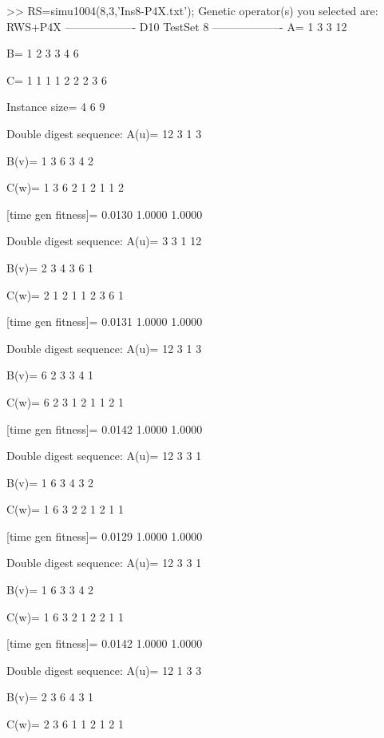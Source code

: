 >> RS=simu1004(8,3,'Ins8-P4X.txt');
Genetic operator(s) you selected are:
RWS+P4X
------------------- D10 TestSet 8 -------------------
A=
     1     3     3    12

B=
     1     2     3     3     4     6

C=
     1     1     1     1     2     2     2     3     6

Instance size=
     4     6     9

Double digest sequence:
A(u)=
    12     3     1     3

B(v)=
     1     3     6     3     4     2

C(w)=
     1     3     6     2     1     2     1     1     2

[time gen fitness]=
    0.0130    1.0000    1.0000

Double digest sequence:
A(u)=
     3     3     1    12

B(v)=
     2     3     4     3     6     1

C(w)=
     2     1     2     1     1     2     3     6     1

[time gen fitness]=
    0.0131    1.0000    1.0000

Double digest sequence:
A(u)=
    12     3     1     3

B(v)=
     6     2     3     3     4     1

C(w)=
     6     2     3     1     2     1     1     2     1

[time gen fitness]=
    0.0142    1.0000    1.0000

Double digest sequence:
A(u)=
    12     3     3     1

B(v)=
     1     6     3     4     3     2

C(w)=
     1     6     3     2     2     1     2     1     1

[time gen fitness]=
    0.0129    1.0000    1.0000

Double digest sequence:
A(u)=
    12     3     3     1

B(v)=
     1     6     3     3     4     2

C(w)=
     1     6     3     2     1     2     2     1     1

[time gen fitness]=
    0.0142    1.0000    1.0000

Double digest sequence:
A(u)=
    12     1     3     3

B(v)=
     2     3     6     4     3     1

C(w)=
     2     3     6     1     1     2     1     2     1

